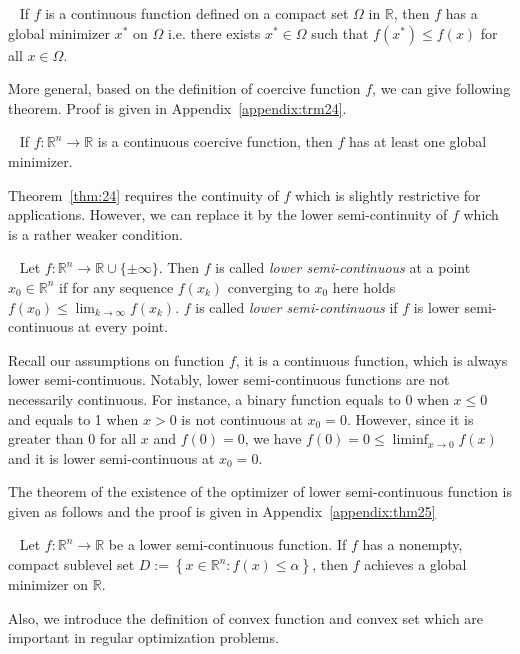 \begin{thm}~\citep{JS:06}
    \label{thm:23}
    If $f$ is a continuous function defined on a compact set $\Omega$ in $\mathbb{R}$, then $f$ has a global minimizer $x^{*}$ on $\Omega$ i.e. there exists $x^{*} \in \Omega$ such that $f\left(x^{*}\right) \leq f(x)$ for all $x \in \Omega$.
\end{thm}
More general, based on the definition of coercive function $f$, we can give following theorem. Proof is given in Appendix~\ref{appendix:trm24}.
\begin{thm}~\citep{JS:06}
    \label{thm:24}
    If $f: \mathbb{R}^{n} \rightarrow \mathbb{R}$ is a continuous coercive function, then $f$ has at least one global minimizer.
\end{thm}
Theorem~\ref{thm:24} requires the continuity of $f$ which is slightly restrictive for applications. However, we can replace it by the lower semi-continuity of $f$ which is a rather weaker condition. 
\begin{defn}~\citep{JS:06}
    Let $f: \mathbb{R}^{n} \rightarrow \mathbb{R} \cup\{\pm \infty\}$. Then $f$ is called \emph{lower semi-continuous} at a point $x_0 \in \mathbb{R}^n$ if for any sequence $f\left(x_{k}\right)$ converging to $x_0$ here holds $f\left(x_{0}\right) \leq \lim _{k \rightarrow \infty} f\left(x_{k}\right)$. $f$ is called \emph{lower semi-continuous} if $f$ is lower semi-continuous at every point.
\end{defn}
Recall our assumptions on function $f$, it is a continuous function, which is always lower semi-continuous. Notably, lower semi-continuous functions are not necessarily continuous. For instance, a binary function equals to 0 when $x \leq 0$ and equals to 1 when $x > 0$ is not continuous at $x_0 = 0$. However, since it is greater than 0 for all $x$ and $f(0) = 0$, we have $f(0)=0 \leq \liminf _{x \rightarrow 0} f(x)$ and it is lower semi-continuous at $x_0 = 0$.
\par The theorem of the existence of the optimizer of lower semi-continuous function is given as follows and the proof is given in Appendix~\ref{appendix:thm25}
\begin{thm}~\citep{JS:06}
    \label{thm:25}
    Let $f: \mathbb{R}^{n} \rightarrow \mathbb{R}$ be a lower semi-continuous function. If $f$ has a nonempty, compact sublevel set $D:=\left\{x \in \mathbb{R}^{n}: f(x) \leq \alpha\right\}$, then $f$ achieves a global minimizer on $\mathbb{R}$.
\end{thm}
Also, we introduce the definition of convex function and convex set which are important in regular optimization problems.
